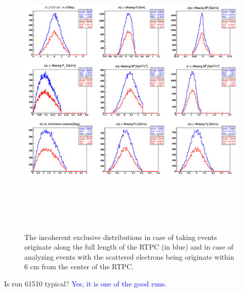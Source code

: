 \begin{figure}[h!]
\centering
\includegraphics[height=14.5cm]{fig/incoh_exc_cuts_z.png}
\caption{The incoherent exclusive distributions in case of taking events 
originate along the full length of the RTPC (in blue) and in case of analyzing 
events with the scattered electrons being originate within 6 cm from the center 
of the RTPC.}
\label{fig:incoh_exc_cuts_z}
 \end{figure}



Is run 61510 typical? 
\textcolor{blue}{
   Yes, it is one of the good runs.  }\\

